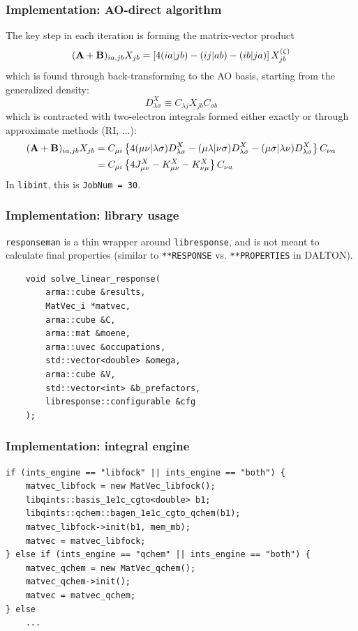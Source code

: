 \documentclass[%
    xcolor=usenames,dvipsnames,svgnames%
]{beamer}
\begin{document}
\begin{frame}
  \frametitle{Implementation: AO-direct algorithm}
  \scriptsize
  The key step in each iteration is forming the matrix-vector product
  \begin{equation*}
    (\boldsymbol{\mathbf{A}}+\boldsymbol{\mathbf{B}})_{ia,jb}X_{jb} = \left[4(ia|jb) - (ij|ab) - (ib|ja)\right] X_{jb}^{(\zeta)}
  \end{equation*}
  which is found through back-transforming to the AO basis, starting from the generalized density:
  \begin{equation*}
    D_{\lambda\sigma}^{X} \equiv C_{\lambda j} X_{jb} C_{\sigma b}
  \end{equation*}
  which is contracted with two-electron integrals formed either exactly or through approximate methods (RI, ...):
  \begin{align*}
    (\boldsymbol{\mathbf{A}}+\boldsymbol{\mathbf{B}})_{ia,jb}X_{jb} &= C_{\mu i} \left\{ 4(\mu\nu|\lambda\sigma)D_{\lambda\sigma}^{X} - (\mu\lambda|\nu\sigma)D_{\lambda\sigma}^{X} - (\mu\sigma|\lambda\nu)D_{\lambda\sigma}^{X} \right\} C_{\nu a} \\
    &= C_{\mu i} \left\{ 4J_{\mu\nu}^{X} - K_{\mu\nu}^{X} - K_{\nu\mu}^{X} \right\} C_{\nu a}
  \end{align*}
  In \texttt{libint}, this is \texttt{JobNum = 30}.
\end{frame}

\begin{frame}[fragile]
  \frametitle{Implementation: library usage}
  \texttt{responseman} is a thin wrapper around \texttt{libresponse}, and is not meant to calculate final properties (similar to \texttt{**RESPONSE} vs. \texttt{**PROPERTIES} in DALTON). \\
  \begin{verbatim}
    void solve_linear_response(
        arma::cube &results,
        MatVec_i *matvec,
        arma::cube &C,
        arma::mat &moene,
        arma::uvec &occupations,
        std::vector<double> &omega,
        arma::cube &V,
        std::vector<int> &b_prefactors,
        libresponse::configurable &cfg
    );
  \end{verbatim}
\end{frame}

\begin{frame}[fragile]
  \frametitle{Implementation: integral engine}
  \scriptsize
  \begin{verbatim}
if (ints_engine == "libfock" || ints_engine == "both") {
    matvec_libfock = new MatVec_libfock();
    libqints::basis_1e1c_cgto<double> b1;
    libqints::qchem::bagen_1e1c_cgto_qchem(b1);
    matvec_libfock->init(b1, mem_mb);
    matvec = matvec_libfock;
} else if (ints_engine == "qchem" || ints_engine == "both") {
    matvec_qchem = new MatVec_qchem();
    matvec_qchem->init();
    matvec = matvec_qchem;
} else
    ...
  \end{verbatim}
\end{frame}
\end{document}
